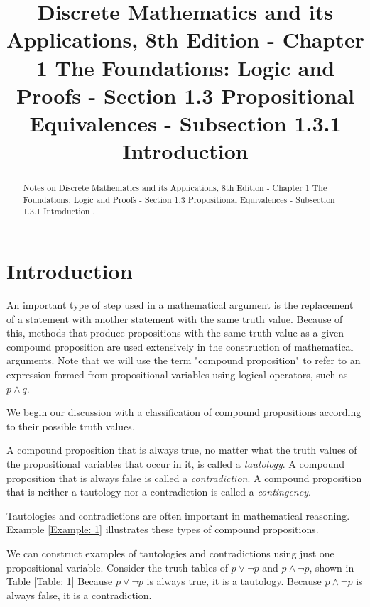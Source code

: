\documentclass{Axon}
\title{Discrete Mathematics and its Applications, 8th Edition - Chapter 1 The Foundations: Logic and Proofs - Section 1.3 Propositional Equivalences - Subsection 1.3.1 Introduction}
\begin{document}
\maketitle
\makeauthor
\begin{abstract}
Notes on Discrete Mathematics and its Applications, 8th Edition - Chapter 1 The Foundations: Logic and Proofs - Section 1.3 Propositional Equivalences - Subsection 1.3.1 Introduction \cite{Rosen}.
\end{abstract}
\section{Introduction}
An important type of step used in a mathematical argument is the replacement of a statement with another statement with the same truth value. Because of this, methods that produce propositions with the same truth value as a given compound proposition are used extensively in the construction of mathematical arguments. Note that we will use the term "compound proposition" to refer to an expression formed from propositional variables using logical operators, such as \(p \land q\).

We begin our discussion with a classification of compound propositions according to their possible truth values.

\begin{definition}
    A compound proposition that is always true, no matter what the truth values of the propositional variables that occur in it, is called a \textit{tautology}. A compound proposition that is always false is called a \textit{contradiction}. A compound proposition that is neither a tautology nor a contradiction is called a \textit{contingency}.
\end{definition}

Tautologies and contradictions are often important in mathematical reasoning. Example \ref{Example: 1} illustrates these types of compound propositions.

\begin{example}\label{Example: 1}
    We can construct examples of tautologies and contradictions using just one propositional variable. Consider the truth tables of \(p \lor \lnot p\) and \(p \land \lnot p\), shown in Table \ref{Table: 1} Because \(p \lor \lnot p\) is always true, it is a tautology. Because \(p \land \lnot p\) is always false, it is a contradiction.
\end{example}
\end{document}
